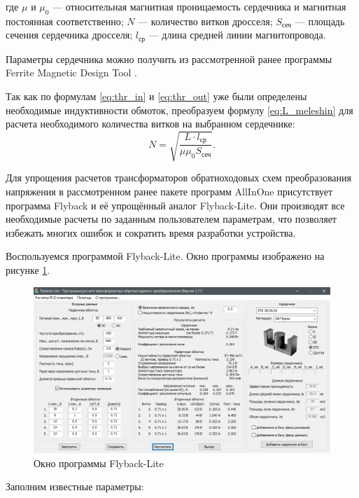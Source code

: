 \documentclass[utf8x, 14pt, oneside, a4paper]{article}
\begin{document}
		\noindent где $\mu$ и $\mu_{\text{0}}$ --- относительная магнитная проницаемость сердечника и магнитная постоянная соответственно; $N$ --- количество витков дросселя; $S_{\text{сеч}}$ --- площадь сечения сердечника дросселя; $l_{\text{ср}}$ --- длина средней линии магнитопровода.
		
		Параметры сердечника можно получить из рассмотренной ранее программы Ferrite Magnetic Design Tool \cite{bib:mdt_epcos}.
		
		Так как по формулам \ref{eq:thr_in} и \ref{eq:thr_out} уже были определены необходимые индуктивности обмоток, преобразуем формулу \ref{eq:L_meleshin} для расчета необходимого количества витков на выбранном сердечнике:
		\begin{equation}
			N = \sqrt{\frac{L \cdot l_{\text{ср}}}{\mu \mu_{\text{0}} S_{\text{сеч}}}}.
			\label{eq:N_meleshin}
		\end{equation}
	
		Для упрощения расчетов трансформаторов обратноходовых схем преобразования напряжения в рассмотренном ранее пакете программ AllInOne \cite{bib:excellentIT} присутствует программа Flyback и её упрощённый аналог Flyback-Lite. Они производят все необходимые расчеты по заданным пользователем параметрам, что позволяет избежать многих ошибок и сократить время разработки устройства.
		
		Воспользуемся программой Flyback-Lite. Окно программы изображено на рисунке \ref{fig:flyback-lite}.
		
		\begin{figure}[H]
			\centering
			\includegraphics[width=0.9\linewidth]{"Рисунки/Flyback-Lite"}
			\caption{Окно программы Flyback-Lite}
			\label{fig:flyback-lite}
		\end{figure}
	
		Заполним известные параметры:
		
\end{document}
